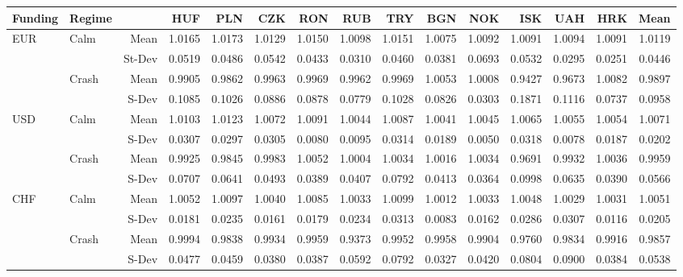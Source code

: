 \documentclass[12pt, a4paper, oneside]{article} %
\begin{document}
\begin{landscape}
\begin{table}[ht]
\begin{threeparttable}
\centering
\begin{tabular}{llrrrrrrrrrrrrr}
  \hline
 Funding & Regime& & HUF & PLN & CZK & RON & RUB & TRY & BGN & NOK & ISK & UAH & HRK & Mean \\ 
  \hline
  \hline
\multirow{4}{*}{EUR}& \multirow{2}{*}{Calm}& Mean & 1.0165 & 1.0173 & 1.0129 & 1.0150 & 1.0098 & 1.0151 & 1.0075 & 1.0092 & 1.0091 & 1.0094 & 1.0091 & 1.0119 \\ 
&&St-Dev& 0.0519 & 0.0486 & 0.0542 & 0.0433 & 0.0310 & 0.0460 & 0.0381 & 0.0693 & 0.0532 & 0.0295 & 0.0251 & 0.0446 \\ 
&\multirow{2}{*}{Crash}& Mean & 0.9905 & 0.9862 & 0.9963 & 0.9969 & 0.9962 & 0.9969 & 1.0053 & 1.0008 & 0.9427 & 0.9673 & 1.0082 & 0.9897 \\ 
 &&S-Dev & 0.1085 & 0.1026 & 0.0886 & 0.0878 & 0.0779 & 0.1028 & 0.0826 & 0.0303 & 0.1871 & 0.1116 & 0.0737 & 0.0958 \\ 
\hline
\multirow{4}{*}{USD}&\multirow{2}{*}{Calm}&Mean& 1.0103 & 1.0123 & 1.0072 & 1.0091 & 1.0044 & 1.0087 & 1.0041 & 1.0045 & 1.0065 & 1.0055 & 1.0054 & 1.0071 \\ 
&&S-Dev& 0.0307 & 0.0297 & 0.0305 & 0.0080 & 0.0095 & 0.0314 & 0.0189 & 0.0050 & 0.0318 & 0.0078 & 0.0187 & 0.0202 \\ 
  &\multirow{2}{*}{Crash}&Mean& 0.9925 & 0.9845 & 0.9983 & 1.0052 & 1.0004 & 1.0034 & 1.0016 & 1.0034 & 0.9691 & 0.9932 & 1.0036 & 0.9959 \\ 
   & & S-Dev & 0.0707 & 0.0641 & 0.0493 & 0.0389 & 0.0407 & 0.0792 & 0.0413 & 0.0364 & 0.0998 & 0.0635 & 0.0390 & 0.0566 \\ 
\hline
\multirow{4}{*}{CHF}& \multirow{2}{*}{Calm}&Mean& 1.0052 & 1.0097 & 1.0040 & 1.0085 & 1.0033 & 1.0099 & 1.0012 & 1.0033 & 1.0048 & 1.0029 & 1.0031 & 1.0051 \\ 
   & & S-Dev & 0.0181 & 0.0235 & 0.0161 & 0.0179 & 0.0234 & 0.0313 & 0.0083 & 0.0162 & 0.0286 & 0.0307 & 0.0116 & 0.0205 \\ 
   & \multirow{2}{*}{Crash}& Mean & 0.9994 & 0.9838 & 0.9934 & 0.9959 & 0.9373 & 0.9952 & 0.9958 & 0.9904 & 0.9760 & 0.9834 & 0.9916 & 0.9857 \\ 
  & & S-Dev & 0.0477 & 0.0459 & 0.0380 & 0.0387 & 0.0592 & 0.0792 & 0.0327 & 0.0420 & 0.0804 & 0.0900 & 0.0384 & 0.0538 \\ 

\end{tabular}
\end{threeparttable}
\end{table}
\end{landscape}
\end{document}
